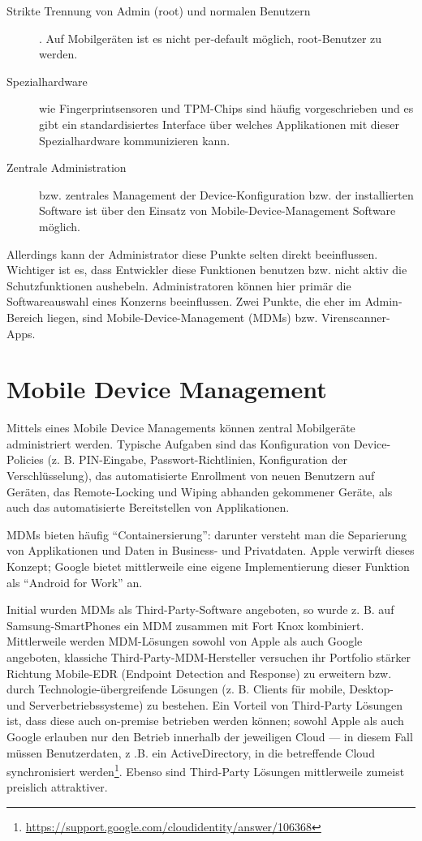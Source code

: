 \begin{description}
	\item[Strikte Trennung von Admin (root) und normalen Benutzern]. Auf Mobilgeräten ist es nicht per-default möglich, root-Benutzer zu werden.
	\item [Spezialhardware] wie Fingerprintsensoren und TPM-Chips sind häufig vorgeschrieben und es gibt ein standardisiertes Interface über welches Applikationen mit dieser Spezialhardware kommunizieren kann.
	\item [Zentrale Administration] bzw. zentrales Management der Device-Konfiguration bzw. der installierten Software ist über den Einsatz von Mobile-Device-Management Software möglich.
\end{description}

Allerdings kann der Administrator diese Punkte selten direkt beeinflussen. Wichtiger ist es, dass Entwickler diese Funktionen benutzen bzw. nicht aktiv die Schutzfunktionen aushebeln. Administratoren können hier primär die Softwareauswahl eines Konzerns beeinflussen. Zwei Punkte, die eher im Admin-Bereich liegen, sind Mobile-Device-Management (MDMs) bzw. Virenscanner-Apps.

\chapter{Mobile Device Management}

Mittels eines Mobile Device Managements können  zentral Mobilgeräte administriert werden. Typische Aufgaben sind das Konfiguration von Device-Policies (z. B. PIN-Eingabe, Passwort-Richtlinien, Konfiguration der Verschlüsselung), das automatisierte Enrollment von neuen Benutzern auf Geräten, das Remote-Locking und Wiping abhanden gekommener Geräte, als auch das automatisierte Bereitstellen von Applikationen.

MDMs bieten häufig ``Containersierung'': darunter versteht man die Separierung von Applikationen und Daten in Business- und Privatdaten. Apple verwirft dieses Konzept; Google bietet mittlerweile eine eigene Implementierung dieser Funktion als ``Android for Work'' an.

Initial wurden MDMs als Third-Party-Software angeboten, so wurde z. B. auf Samsung-SmartPhones ein MDM zusammen mit Fort Knox kombiniert. Mittlerweile werden MDM-Lösungen sowohl von Apple als auch Google angeboten, klassiche Third-Party-MDM-Hersteller versuchen ihr Portfolio stärker Richtung Mobile-EDR (Endpoint Detection and Response) zu erweitern bzw. durch Technologie-übergreifende Lösungen (z. B. Clients für mobile, Desktop- und Serverbetriebssysteme) zu bestehen. Ein Vorteil von Third-Party Lösungen ist, dass diese auch on-premise betrieben werden können; sowohl Apple als auch Google erlauben nur den Betrieb innerhalb der jeweiligen Cloud --- in diesem Fall müssen Benutzerdaten, z .B. ein ActiveDirectory, in die betreffende Cloud synchronisiert werden\footnote{\url{https://support.google.com/cloudidentity/answer/106368}}. Ebenso sind Third-Party Lösungen mittlerweile zumeist preislich attraktiver.

